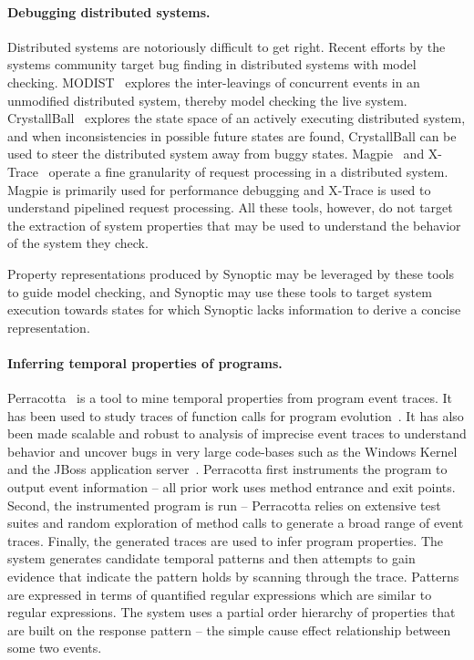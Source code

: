 
\paragraph{Debugging distributed systems.} Distributed systems are
notoriously difficult to get right. Recent efforts by the systems
community target bug finding in distributed systems with model
checking. MODIST~\cite{MODIST} explores the inter-leavings of
concurrent events in an unmodified distributed system, thereby model
checking the live system. CrystallBall~\cite{CrystallBall} explores
the state space of an actively executing distributed system, and when
inconsistencies in possible future states are found, CrystallBall can
be used to steer the distributed system away from buggy states.
Magpie~\cite{Magpie} and X-Trace~\cite{XTrace} operate a fine
granularity of request processing in a distributed system. Magpie is
primarily used for performance debugging and X-Trace is used to
understand pipelined request processing. All these tools, however, do
not target the extraction of system properties that may be used to
understand the behavior of the system they check.

Property representations produced by Synoptic may be leveraged
by these tools to guide model checking, and Synoptic may use these
tools to target system execution towards states for which Synoptic
lacks information to derive a concise representation.

\paragraph{Inferring temporal properties of programs.}
Perracotta~\cite{Perracotta04_Main} is a tool to mine temporal
properties from program event traces. It has been used to study traces
of function calls for program
evolution~\cite{Perracotta04_ProgramEvolution}. It has also been made
scalable and robust to analysis of imprecise event traces to
understand behavior and uncover bugs in very large code-bases such as
the Windows Kernel and the JBoss application
server~\cite{Perracotta06_ImperfectTraces}. Perracotta first
instruments the program to output event information -- all prior work
uses method entrance and exit points. Second, the instrumented program
is run -- Perracotta relies on extensive test suites and random
exploration of method calls to generate a broad range of event
traces. Finally, the generated traces are used to infer program
properties. The system generates candidate temporal patterns and then
attempts to gain evidence that indicate the pattern holds by scanning
through the trace. Patterns are expressed in terms of quantified
regular expressions which are similar to regular expressions. The
system uses a partial order hierarchy of properties that are built on
the response pattern -- the simple cause effect relationship between
some two events.


